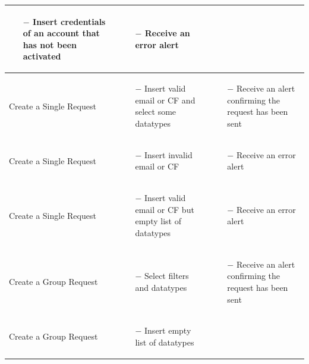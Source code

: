 \documentclass[titlepage]{article}
\begin{document}
\begin{longtable}{| p{3 cm} | p{4 cm} | p{4 cm} |}
\begin{itemize}[nolistsep]
			\item[$-$] Insert credentials of an account that has not been activated
		\end{itemize}
		& \begin{itemize}[nolistsep]
			\item[$-$] Receive an error alert
		\end{itemize} \\ \hline
		Create a Single Request & \begin{itemize}[nolistsep]
			\item[$-$] Insert valid email or CF and select some datatypes
		\end{itemize}
		& \begin{itemize}[nolistsep]
			\item[$-$] Receive an alert confirming the request has been sent
		\end{itemize} \\ \hline
		Create a Single Request & \begin{itemize}[nolistsep]
			\item[$-$] Insert invalid email or CF
		\end{itemize}
		& \begin{itemize}[nolistsep]
			\item[$-$] Receive an error alert
		\end{itemize} \\ \hline
		Create a Single Request & \begin{itemize}[nolistsep]
			\item[$-$] Insert valid email or CF but empty list of datatypes
		\end{itemize}
		& \begin{itemize}[nolistsep]
			\item[$-$] Receive an error alert
		\end{itemize} \\ \hline
		Create a Group Request & \begin{itemize}[nolistsep]
			\item[$-$] Select filters and datatypes
		\end{itemize}
		& \begin{itemize}[nolistsep]
			\item[$-$] Receive an alert confirming the request has been sent
		\end{itemize} \\ \hline
		Create a Group Request & \begin{itemize}[nolistsep]
			\item[$-$] Insert empty list of datatypes

\end{itemize}
\end{longtable}
\end{document}
